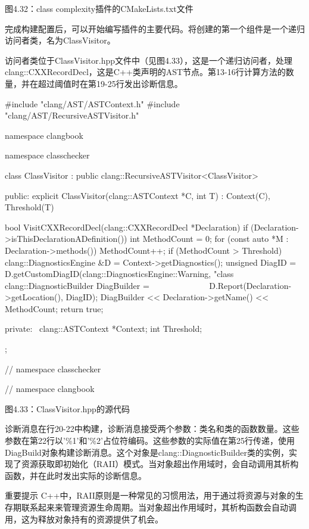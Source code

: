 \begin{center}
图4.32：class complexity插件的CMakeLists.txt文件
\end{center}

完成构建配置后，可以开始编写插件的主要代码。将创建的第一个组件是一个递归访问者类，名为ClassVisitor。


访问者类位于ClassVisitor.hpp文件中（见图4.33），这是一个递归访问者，处理clang::CXXRecordDecl，这是C++类声明的AST节点。第13-16行计算方法的数量，并在超过阈值时在第19-25行发出诊断信息。

\begin{cpp}
#include "clang/AST/ASTContext.h"
#include "clang/AST/RecursiveASTVisitor.h"

namespace clangbook {
namespace classchecker {
class ClassVisitor : public clang::RecursiveASTVisitor<ClassVisitor> {
public:
  explicit ClassVisitor(clang::ASTContext *C, int T)
    : Context(C), Threshold(T) {}

  bool VisitCXXRecordDecl(clang::CXXRecordDecl *Declaration) {
    if (Declaration->isThisDeclarationADefinition()) {
      int MethodCount = 0;
      for (const auto *M : Declaration->methods()) {
        MethodCount++;
      }
      if (MethodCount > Threshold) {
        clang::DiagnosticsEngine &D = Context->getDiagnostics();
        unsigned DiagID =
          D.getCustomDiagID(clang::DiagnosticsEngine::Warning,
                            "class %
        clang::DiagnosticBuilder DiagBuilder =
               D.Report(Declaration->getLocation(), DiagID);
        DiagBuilder << Declaration->getName() << MethodCount;
      }
    }
    return true;
  }

private:
  clang::ASTContext *Context;
  int Threshold;
};
} // namespace classchecker
} // namespace clangbook
\end{cpp}

\begin{center}
图4.33：ClassVisitor.hpp的源代码
\end{center}

诊断消息在行20-22中构建，诊断消息接受两个参数：类名和类的函数数量。这些参数在第22行以'\%1'和'\%2'占位符编码。这些参数的实际值在第25行传递，使用DiagBuild对象构建诊断消息。这个对象是clang::DiagnosticBuilder类的实例，实现了资源获取即初始化（RAII）模式。当对象超出作用域时，会自动调用其析构函数，并在此时发出实际的诊断信息。

\begin{myNotic}{重要提示}
C++中，RAII原则是一种常见的习惯用法，用于通过将资源与对象的生存期联系起来来管理资源生命周期。当对象超出作用域时，其析构函数会自动调用，这为释放对象持有的资源提供了机会。
\end{myNotic}

